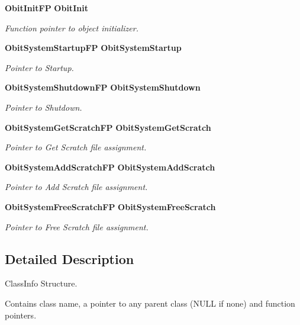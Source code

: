 \begin{CompactItemize}
{\bf Obit\-Init\-FP} {\bf Obit\-Init}
\begin{CompactList}\small\item\em Function pointer to object initializer. \item\end{CompactList}\item 
{\bf Obit\-System\-Startup\-FP} {\bf Obit\-System\-Startup}
\begin{CompactList}\small\item\em Pointer to Startup. \item\end{CompactList}\item 
{\bf Obit\-System\-Shutdown\-FP} {\bf Obit\-System\-Shutdown}
\begin{CompactList}\small\item\em Pointer to Shutdown. \item\end{CompactList}\item 
{\bf Obit\-System\-Get\-Scratch\-FP} {\bf Obit\-System\-Get\-Scratch}
\begin{CompactList}\small\item\em Pointer to Get Scratch file assignment. \item\end{CompactList}\item 
{\bf Obit\-System\-Add\-Scratch\-FP} {\bf Obit\-System\-Add\-Scratch}
\begin{CompactList}\small\item\em Pointer to Add Scratch file assignment. \item\end{CompactList}\item 
{\bf Obit\-System\-Free\-Scratch\-FP} {\bf Obit\-System\-Free\-Scratch}
\begin{CompactList}\small\item\em Pointer to Free Scratch file assignment. \item\end{CompactList}\end{CompactItemize}


\subsection{Detailed Description}
Class\-Info Structure. 

Contains class name, a pointer to any parent class (NULL if none) and function pointers. 



